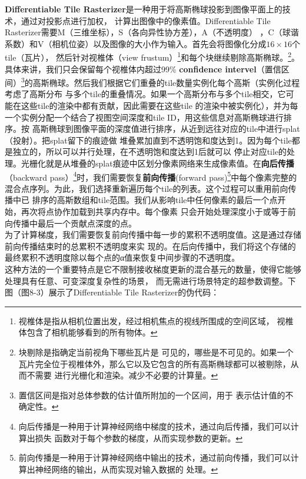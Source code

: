 \documentclass{nwputhesis}
\begin{document}
\indent
\textbf{Differentiable Tile Rasterizer}是一种用于将高斯椭球投影到图像平面上的技术，通过对投影点进行加权，
计算出图像中的像素值。Differentiable Tile Rasterizer需要M（三维坐标），S（各向异性协方差），A（不透明度）
，C（球谐系数）和V（相机位姿）以及图像的大小作为输入。首先会将图像化分成$16\times16$个tile（瓦片），
然后针对视椎体（view frustum）\footnote{视椎体是指从相机位置出发，经过相机焦点的视线所围成的空间区域，
视椎体包含了相机能够看到的所有物体。}和每个块继续剔除高斯椭球。\footnote{块剔除是指确定当前视角下哪些瓦片是
可见的，哪些是不可见的。如果一个瓦片完全位于视椎体外，那么它以及它包含的所有高斯椭球都可以被剔除，从而不需要
进行光栅化和渲染。减少不必要的计算量。}。具体来讲，我们只会保留每个视椎体内超过99\% 
\textbf{confidence intervel}（置信区间）\footnote{置信区间是指对总体参数的估计值所附加的一个区间，用于
表示估计值的不确定性。}的高斯椭球。然后我们根据它们重叠的tile数量实例化每个高斯（实例化过程考虑了高斯分布
与多个tile的重叠情况。如果一个高斯分布与多个tile相交，它可能在这些tile的渲染中都有贡献，因此需要在这些tile
的渲染中被实例化），并为每一个实例分配一个结合了视图空间深度和tile ID，用这些信息对高斯椭球进行排序。按
高斯椭球到图像平面的深度值进行排序，从近到远往对应的tile中进行splat（投射）。把splat留下的痕迹做
堆叠累加直到不透明饱和度达到1。因为每个tile都是独立的，所以可以并行处理，在不透明饱和度达到1后就可以
停止对应tile的处理。光栅化就是从堆叠的splat痕迹中区划分像素网络来生成像素值。在\textbf{向后传播}
（backward pass）\footnote{向后传播是一种用于计算神经网络中梯度的技术，通过向后传播，我们可以计算出损失
函数对于每个参数的梯度，从而实现参数的更新。}时，我们需要恢复\textbf{前向传播}(forward pass)\footnote{
前向传播是一种用于计算神经网络中输出的技术，通过前向传播，我们可以计算出神经网络的输出，从而实现对输入数据的
处理。}中每个像素完整的混合点序列。为此，我们选择重新遍历每个tile的列表。这个过程可以重用前向传播中已
排序的高斯数组和tile范围。我们从影响tile中任何像素的最后一个点开始，再次将点协作加载到共享内存中。每个像素
只会开始处理深度小于或等于前向传播中最后一个贡献点深度的点。\\
\indent
为了计算梯度，我们需要恢复前向传播中每一步的累积不透明度值。这是通过存储前向传播结束时的总累积不透明度来实
现的。在后向传播中，我们将这个存储的最终累积不透明度除以每个点的α值来恢复中间步骤的不透明度。\\
\indent
这种方法的一个重要特点是它不限制接收梯度更新的混合基元的数量，使得它能够处理具有任意、可变深度复杂性的场景，
而无需进行场景特定的超参数调整。下图（图8-3）展示了Differentiable Tile Rasterizer的伪代码：
\end{document}
